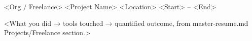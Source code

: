 
\begin{cventries}

  \cventry
    {<Org / Freelance>}
    {<Project Name>}
    {<Location>}
    {<Start> -- <End>}
    {
      \begin{cvitems}
        \item {<What you did → tools touched → quantified outcome, from master-resume.md Projects/Freelance section.>}
      \end{cvitems}
    }

\end{cventries}
